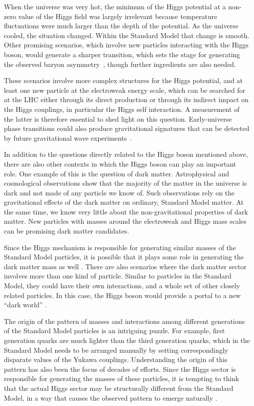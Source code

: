 \documentclass{article}
\begin{document}
When the universe was very hot, the minimum of the Higgs potential at
a non-zero value of the Higgs field was largely irrelevant because
temperature fluctuations were much larger than the depth of the
potential.
%
As the universe cooled, the situation changed.
%
Within the Standard Model that change is smooth. Other promising scenarios, which involve new particles interacting with the Higgs boson, would
generate a sharper  transition, which sets the
stage for generating the observed baryon asymmetry~\cite{Cohen:1993nk}, though
further ingredients are also needed.

These scenarios involve more complex structures for the Higgs
potential, and at least one new particle at the electroweak energy scale, which can be
searched for at the LHC either through its direct production or
through its indirect impact on the Higgs couplings, in particular the
Higgs self interaction. 
%
A measurement of the latter is therefore essential to shed light on
this question.
%
Early-universe phase transitions could also produce gravitational signatures that 
can be detected by future gravitational wave
experiments~\cite{Caprini:2015zlo,Caprini:2019egz}. 

In addition to the questions directly related to the Higgs boson
mentioned above, there are also other contexts in which the Higgs boson can play an important role.  One example of this is the question of dark matter. 
Astrophysical and cosmological observations show 
that the majority of the matter in the universe is dark and not made
of any particle we know of.
%
Such observations rely on the
gravitational effects of the dark matter on ordinary, Standard Model
matter.
%
At the same time, we know very little about the non-gravitational
properties of dark matter.
%
New particles with masses around
the electroweak and Higgs mass scales can be promising dark matter
candidates.

Since the Higgs mechanism is responsible for generating similar masses
of the Standard Model particles, it is possible that it plays some role
in generating the dark matter mass as
well
\cite{Silveira:1985rk,Burgess:2000yq,McDonald:1993ex}.
%
There are also scenarios where the dark matter sector involves more
than one kind of particle.
%
Similar to particles in the Standard Model, they could have their own
interactions, and a whole set of other closely related particles.
%
In this case, the Higgs boson would provide a portal to a new ``dark
world'' \cite{Patt:2006fw}. 


The origin of the pattern of masses and interactions among different
generations of the Standard Model particles is an intriguing puzzle.
%
For example, first generation quarks are much
lighter than the third generation quarks, which in the Standard Model
needs to be arranged manually by setting correspondingly disparate
values of the Yukawa couplings.
%
Understanding the origin of this pattern has also
been the focus of decades of efforts.
%
Since the Higgs sector is responsible for generating the masses of
these particles, it is tempting to think that the actual Higgs sector
may be structurally different from the Standard Model, in a way that
causes the observed pattern to emerge naturally \cite{Barr:1976bk,Bjorken:1977vt,Babu:1999me}.
\end{document}

